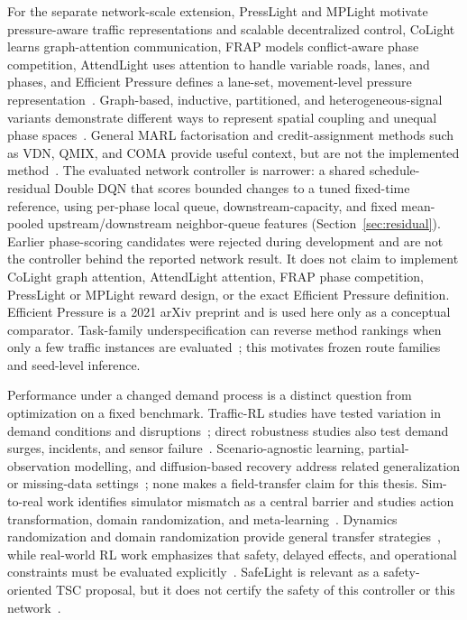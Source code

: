\documentclass[12pt,a4paper]{report}
\begin{document}
For the separate network-scale extension, PressLight and MPLight motivate pressure-aware traffic representations and scalable decentralized control, CoLight learns graph-attention communication, FRAP models conflict-aware phase competition, AttendLight uses attention to handle variable roads, lanes, and phases, and Efficient Pressure defines a lane-set, movement-level pressure representation~\cite{wei2019presslight,chen2020mplight,wei2019colight,zheng2019frap,oroojlooy2020attendlight,wu2021efficientpressure}. Graph-based, inductive, partitioned, and heterogeneous-signal variants demonstrate different ways to represent spatial coupling and unequal phase spaces~\cite{zeng2021graphlight,devailly2022igrl,ma2024partition,zhang2024heterolight}. General MARL factorisation and credit-assignment methods such as VDN, QMIX, and COMA provide useful context, but are not the implemented method~\cite{sunehag2017vdn,rashid2018qmix,foerster2018coma}. The evaluated network controller is narrower: a shared schedule-residual Double DQN that scores bounded changes to a tuned fixed-time reference, using per-phase local queue, downstream-capacity, and fixed mean-pooled upstream/downstream neighbor-queue features (Section~\ref{sec:residual}). Earlier phase-scoring candidates were rejected during development and are not the controller behind the reported network result. It does not claim to implement CoLight graph attention, AttendLight attention, FRAP phase competition, PressLight or MPLight reward design, or the exact Efficient Pressure definition. Efficient Pressure is a 2021 arXiv preprint and is used here only as a conceptual comparator. Task-family underspecification can reverse method rankings when only a few traffic instances are evaluated~\cite{jayawardana2022underspecification}; this motivates frozen route families and seed-level inference.

Performance under a changed demand process is a distinct question from optimization on a fixed benchmark. Traffic-RL studies have tested variation in demand conditions and disruptions~\cite{zeng2019conditions,korecki2023disruptions}; direct robustness studies also test demand surges, incidents, and sensor failure~\cite{rodrigues2019robust,tan2020robust}. Scenario-agnostic learning, partial-observation modelling, and diffusion-based recovery address related generalization or missing-data settings~\cite{jiang2024scenarioagnostic,chen2024difflight,li2025robustlight}; none makes a field-transfer claim for this thesis. Sim-to-real work identifies simulator mismatch as a central barrier and studies action transformation, domain randomization, and meta-learning~\cite{da2023sim2real,muller2023realitygap}. Dynamics randomization and domain randomization provide general transfer strategies~\cite{peng2018dynamics,tobin2017domainrandomization}, while real-world RL work emphasizes that safety, delayed effects, and operational constraints must be evaluated explicitly~\cite{dulacarnold2019challenges}. SafeLight is relevant as a safety-oriented TSC proposal, but it does not certify the safety of this controller or this network~\cite{du2023safelight}.
\end{document}
